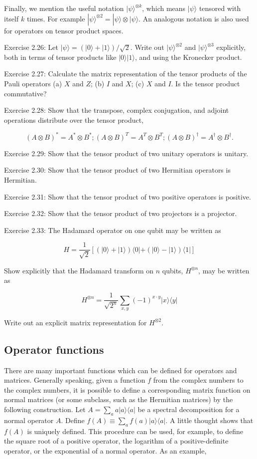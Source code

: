 \documentclass[
	11pt, %
	fleqn, %
	a4paper, %
]{LegrandOrangeBook}
\begin{document}
Finally, we mention the useful notation $|\psi\rangle^{\otimes k}$, which means $|\psi\rangle$ tensored with itself $k$ times. For example $|\psi\rangle^{\otimes 2}=|\psi\rangle \otimes|\psi\rangle$. An analogous notation is also used for operators on tensor product spaces.

Exercise 2.26: Let $|\psi\rangle=(|0\rangle+|1\rangle) / \sqrt{2}$. Write out $|\psi\rangle^{\otimes 2}$ and $|\psi\rangle^{\otimes 3}$ explicitly, both in terms of tensor products like $|0\rangle|1\rangle$, and using the Kronecker product.

Exercise 2.27: Calculate the matrix representation of the tensor products of the Pauli operators (a) $X$ and $Z$; (b) $I$ and $X$; (c) $X$ and $I$. Is the tensor product commutative?

Exercise 2.28: Show that the transpose, complex conjugation, and adjoint operations distribute over the tensor product,

$$
(A \otimes B)^{*}=A^{*} \otimes B^{*} ;(A \otimes B)^{T}=A^{T} \otimes B^{T} ;(A \otimes B)^{\dagger}=A^{\dagger} \otimes B^{\dagger} .
$$

Exercise 2.29: Show that the tensor product of two unitary operators is unitary.

Exercise 2.30: Show that the tensor product of two Hermitian operators is Hermitian.

Exercise 2.31: Show that the tensor product of two positive operators is positive.

Exercise 2.32: Show that the tensor product of two projectors is a projector.

Exercise 2.33: The Hadamard operator on one qubit may be written as

$$
H=\frac{1}{\sqrt{2}}[(|0\rangle+|1\rangle)\langle 0|+(|0\rangle-|1\rangle)\langle 1|]
$$

Show explicitly that the Hadamard transform on $n$ qubits, $H^{\otimes n}$, may be written as

$$
H^{\otimes n}=\frac{1}{\sqrt{2^{n}}} \sum_{x, y}(-1)^{x \cdot y}|x\rangle\langle y|
$$

Write out an explicit matrix representation for $H^{\otimes 2}$.

\subsection{Operator functions}

There are many important functions which can be defined for operators and matrices. Generally speaking, given a function $f$ from the complex numbers to the complex numbers, it is possible to define a corresponding matrix function on normal matrices (or some subclass, such as the Hermitian matrices) by the following construction. Let $A=\sum_{a} a|a\rangle\langle a|$ be a spectral decomposition for a normal operator $A$. Define $f(A) \equiv \sum_{a} f(a)|a\rangle\langle a|$. A little thought shows that $f(A)$ is uniquely defined. This procedure can be used, for example, to define the square root of a positive operator, the logarithm of a positive-definite operator, or the exponential of a normal operator. As an example,
\end{document}
